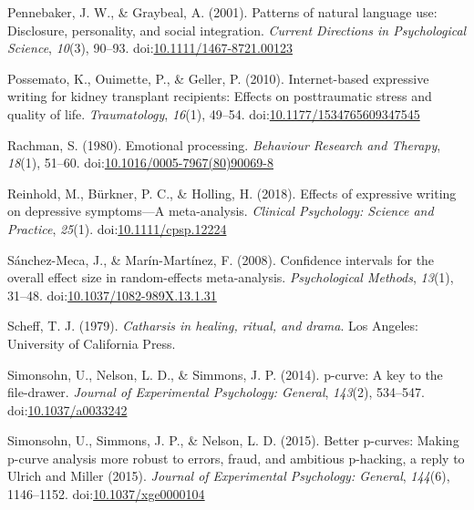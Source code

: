 \documentclass[,man]{apa6}
\begin{document}
\leavevmode\hypertarget{ref-Pennebaker2001}{}%
Pennebaker, J. W., \& Graybeal, A. (2001). Patterns of natural language use: Disclosure, personality, and social integration. \emph{Current Directions in Psychological Science}, \emph{10}(3), 90--93. doi:\href{https://doi.org/10.1111/1467-8721.00123}{10.1111/1467-8721.00123}

\leavevmode\hypertarget{ref-Possemato2010}{}%
Possemato, K., Ouimette, P., \& Geller, P. (2010). Internet-based expressive writing for kidney transplant recipients: Effects on posttraumatic stress and quality of life. \emph{Traumatology}, \emph{16}(1), 49--54. doi:\href{https://doi.org/10.1177/1534765609347545}{10.1177/1534765609347545}

\leavevmode\hypertarget{ref-Rachman1980}{}%
Rachman, S. (1980). Emotional processing. \emph{Behaviour Research and Therapy}, \emph{18}(1), 51--60. doi:\href{https://doi.org/10.1016/0005-7967(80)90069-8}{10.1016/0005-7967(80)90069-8}

\leavevmode\hypertarget{ref-Reinhold2018}{}%
Reinhold, M., Bürkner, P. C., \& Holling, H. (2018). Effects of expressive writing on depressive symptoms---A meta-analysis. \emph{Clinical Psychology: Science and Practice}, \emph{25}(1). doi:\href{https://doi.org/10.1111/cpsp.12224}{10.1111/cpsp.12224}

\leavevmode\hypertarget{ref-Sanchez-Meca2008a}{}%
Sánchez-Meca, J., \& Marín-Martínez, F. (2008). Confidence intervals for the overall effect size in random-effects meta-analysis. \emph{Psychological Methods}, \emph{13}(1), 31--48. doi:\href{https://doi.org/10.1037/1082-989X.13.1.31}{10.1037/1082-989X.13.1.31}

\leavevmode\hypertarget{ref-Scheff1979}{}%
Scheff, T. J. (1979). \emph{Catharsis in healing, ritual, and drama}. Los Angeles: University of California Press.

\leavevmode\hypertarget{ref-Simonsohn2014}{}%
Simonsohn, U., Nelson, L. D., \& Simmons, J. P. (2014). p-curve: A key to the file-drawer. \emph{Journal of Experimental Psychology: General}, \emph{143}(2), 534--547. doi:\href{https://doi.org/10.1037/a0033242}{10.1037/a0033242}

\leavevmode\hypertarget{ref-Simonsohn2015}{}%
Simonsohn, U., Simmons, J. P., \& Nelson, L. D. (2015). Better p-curves: Making p-curve analysis more robust to errors, fraud, and ambitious p-hacking, a reply to Ulrich and Miller (2015). \emph{Journal of Experimental Psychology: General}, \emph{144}(6), 1146--1152. doi:\href{https://doi.org/10.1037/xge0000104}{10.1037/xge0000104}
\end{document}

